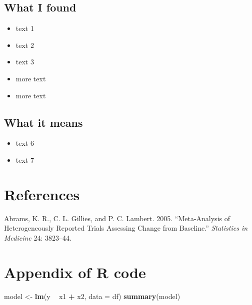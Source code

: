 \documentclass[
  openany]{book}
\newenvironment{Shaded}{\begin{snugshade}}{\end{snugshade}}
\newcommand{\DataTypeTok}[1]{\textcolor[rgb]{0.13,0.29,0.53}{#1}}
\newcommand{\KeywordTok}[1]{\textcolor[rgb]{0.13,0.29,0.53}{\textbf{#1}}}
\newcommand{\NormalTok}[1]{#1}
\newcommand{\OperatorTok}[1]{\textcolor[rgb]{0.81,0.36,0.00}{\textbf{#1}}}
\newcommand{\StringTok}[1]{\textcolor[rgb]{0.31,0.60,0.02}{#1}}
\providecommand{\tightlist}{%
  \setlength{\itemsep}{0pt}\setlength{\parskip}{0pt}}
\begin{document}
\hypertarget{what-i-found}{%
\section{What I found}\label{what-i-found}}

\begin{itemize}
\tightlist
\item
  text 1
\item
  text 2
\item
  text 3
\item
  more text
\item
  more text
\end{itemize}

\hypertarget{what-it-means}{%
\section{What it means}\label{what-it-means}}

\begin{itemize}
\tightlist
\item
  text 6
\item
  text 7
\end{itemize}

\hypertarget{references}{%
\chapter{References}\label{references}}

\hypertarget{refs}{}
\leavevmode\hypertarget{ref-Abrams2005}{}%
Abrams, K. R., C. L. Gillies, and P. C. Lambert. 2005. ``Meta-Analysis of Heterogeneously Reported Trials Assessing Change from Baseline.'' \emph{Statistics in Medicine} 24: 3823--44.

\hypertarget{appendix-appendix}{%
\appendix}


\hypertarget{appendix-of-r-code}{%
\chapter*{Appendix of R code}\label{appendix-of-r-code}}

\begin{Shaded}
\begin{Highlighting}[]
\NormalTok{model <-}\StringTok{ }\KeywordTok{lm}\NormalTok{(y }\OperatorTok{~}\StringTok{ }\NormalTok{x1 }\OperatorTok{+}\StringTok{ }\NormalTok{x2, }\DataTypeTok{data =}\NormalTok{ df)}
\KeywordTok{summary}\NormalTok{(model)}
\end{Highlighting}
\end{Shaded}

\backmatter
\backmatter
\end{document}
